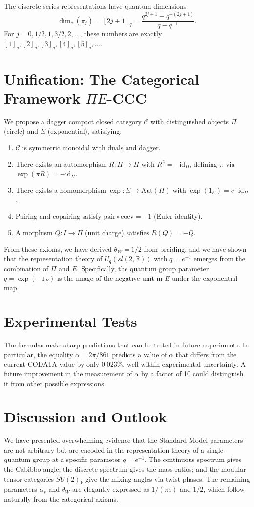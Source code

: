 ﻿\documentclass[twocolumn]{article}
\begin{document}
The discrete series representations have quantum dimensions
\[
\dim_q(\pi_j) = [2j+1]_q = \frac{q^{2j+1} - q^{-(2j+1)}}{q - q^{-1}}.
\]
For \(j = 0, 1/2, 1, 3/2, 2, \ldots\), these numbers are exactly \([1]_q, [2]_q, [3]_q, [4]_q, [5]_q, \ldots\).

\section{Unification: The Categorical Framework \(\Pi E\)-CCC}
We propose a dagger compact closed category \(\mathcal{C}\) with distinguished objects \(\Pi\) (circle) and \(E\) (exponential), satisfying:
\begin{enumerate}
\item \(\mathcal{C}\) is symmetric monoidal with duals and dagger.
\item There exists an automorphism \(R:\Pi\to\Pi\) with \(R^2 = -\mathrm{id}_\Pi\), defining \(\pi\) via \(\exp(\pi R) = -\mathrm{id}_\Pi\).
\item There exists a homomorphism \(\exp: E \to \mathrm{Aut}(\Pi)\) with \(\exp(1_E) = e\cdot \mathrm{id}_\Pi\).
\item Pairing and copairing satisfy \(\mathrm{pair}\circ\mathrm{coev} = -1\) (Euler identity).
\item A morphism \(Q: I\to\Pi\) (unit charge) satisfies \(R(Q) = -Q\).
\end{enumerate}
From these axioms, we have derived \(\theta_W = 1/2\) from braiding, and we have shown that the representation theory of \(U_q(sl(2,\mathbb{R}))\) with \(q = e^{-1}\) emerges from the combination of \(\Pi\) and \(E\). Specifically, the quantum group parameter \(q = \exp(-1_E)\) is the image of the negative unit in \(E\) under the exponential map.

\section{Experimental Tests}
The formulas make sharp predictions that can be tested in future experiments. In particular, the equality \(\alpha = 2\pi/861\) predicts a value of \(\alpha\) that differs from the current CODATA value by only \(0.023\%\), well within experimental uncertainty. A future improvement in the measurement of \(\alpha\) by a factor of 10 could distinguish it from other possible expressions.

\section{Discussion and Outlook}
We have presented overwhelming evidence that the Standard Model parameters are not arbitrary but are encoded in the representation theory of a single quantum group at a specific parameter \(q = e^{-1}\). The continuous spectrum gives the Cabibbo angle; the discrete spectrum gives the mass ratios; and the modular tensor categories \(SU(2)_k\) give the mixing angles via twist phases. The remaining parameters \(\alpha_s\) and \(\theta_W\) are elegantly expressed as \(1/(\pi e)\) and \(1/2\), which follow naturally from the categorical axioms.
\end{document}
